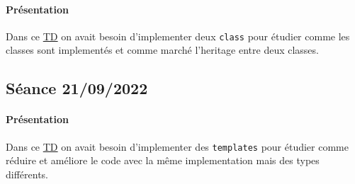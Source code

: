 \documentclass{article}
\begin{document}
\paragraph{Présentation}Dans ce \href{https://perso.ensta-paris.fr/~bmonsuez/Cours/doku.php?id=in204:seances:seance2}{TD} on avait besoin d'implementer deux \texttt{class} pour étudier comme les classes sont implementés et comme marché l'heritage entre deux classes.
\begin{scriptsize}\mycode
    
\end{scriptsize}
\begin{scriptsize}\mycode
    
\end{scriptsize}
\begin{scriptsize}\mycode
    
\end{scriptsize}

\newpage\subsection{Séance 21/09/2022}
\paragraph{Présentation}Dans ce \href{https://perso.ensta-paris.fr/~bmonsuez/Cours/doku.php?id=in204:seances:seance3}{TD} on avait besoin d'implementer des \texttt{templates} pour étudier comme réduire et améliore le code avec la même implementation mais des types différents.
\begin{scriptsize}\mycode
    
\end{scriptsize}
\begin{scriptsize}\mycode
    
\end{scriptsize}
\end{document}
